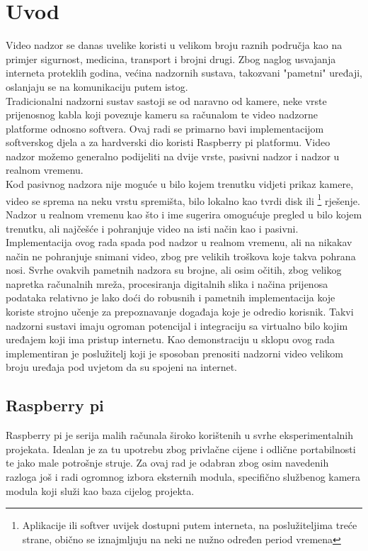 \section{Uvod}
Video nadzor se danas uvelike koristi u velikom broju raznih područja kao na primjer sigurnost, medicina, transport
i brojni drugi.
\paraBreak
Zbog naglog usvajanja interneta proteklih godina, većina nadzornih sustava, takozvani "pametni" uređaji, oslanjaju se
na komunikaciju putem istog. \\
Tradicionalni nadzorni sustav sastoji se od naravno od kamere, neke vrste prijenosnog kabla koji povezuje kameru sa
računalom te video nadzorne platforme odnosno softvera. Ovaj radi se primarno bavi implementacijom softverskog djela a 
za hardverski dio koristi Raspberry pi platformu.
\paraBreak
Video nadzor možemo generalno podijeliti na dvije vrste, pasivni nadzor i nadzor u realnom vremenu. \\
Kod pasivnog nadzora nije moguće u bilo kojem trenutku vidjeti prikaz kamere, video se sprema na neku vrstu spremišta, bilo
lokalno kao tvrdi disk ili 
\footnote
{
  Aplikacije ili softver uvijek dostupni putem interneta, na poslužiteljima treće strane, obično se iznajmljuju na neki ne nužno
  određen period vremena 
}
rješenje. \\
Nadzor u realnom vremenu kao što i ime sugerira omogućuje pregled u bilo kojem trenutku, ali najčešće i pohranjuje
video na isti način kao i pasivni. \\
Implementacija ovog rada spada pod nadzor u realnom vremenu, ali na nikakav način ne pohranjuje snimani video, zbog pre velikih
troškova koje takva pohrana nosi. 
\paraBreak
Svrhe ovakvih pametnih nadzora su brojne, ali osim očitih, zbog velikog napretka računalnih mreža, procesiranja digitalnih
slika i načina prijenosa podataka relativno je lako doći do robusnih i pametnih implementacija koje koriste strojno učenje
za prepoznavanje događaja koje je odredio korisnik. Takvi nadzorni sustavi imaju ogroman potencijal i integraciju sa virtualno
bilo kojim uređajem koji ima pristup internetu. Kao demonstraciju u sklopu ovog rada implementiran je poslužitelj
koji je sposoban prenositi nadzorni video velikom broju uređaja pod uvjetom da su spojeni na internet.

\pagebreak
\subsection{Raspberry pi}
Raspberry pi je serija malih  
računala široko korištenih u svrhe eksperimentalnih projekata. \cite{rPiBook}
\paraBreak
Idealan je za tu upotrebu zbog privlačne cijene i odlične portabilnosti te jako male potrošnje struje.
\paraBreak
Za ovaj rad je odabran zbog osim navedenih razloga još i radi ogromnog izbora eksternih modula, specifično službenog kamera modula
koji služi kao baza cijelog projekta.

